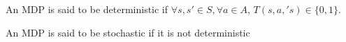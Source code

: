 \begin{defn}
\label{defn:determinism}
An MDP is said to be deterministic if $\forall s,s' \in S, \forall a \in A$, $T(s,a,'s) \in \{0,1\}$.
\end{defn}
\begin{defn}
\label{defn:stochastic}
An MDP is said to be stochastic if it is not deterministic
\end{defn}
